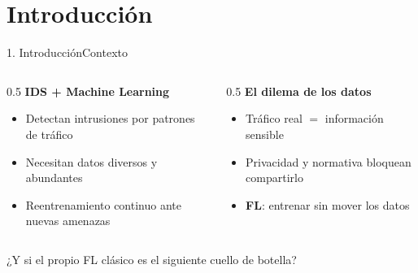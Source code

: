 \section{Introducción}
\begin{frame}{1. Introducción}{Contexto}
  \begin{columns}[T]
    \begin{column}{0.5\textwidth}
      \textbf{IDS + Machine Learning}\\[0.3em]
      \begin{itemize}
        \item Detectan intrusiones por patrones de tráfico
        \item Necesitan datos diversos y abundantes
        \item Reentrenamiento continuo ante nuevas amenazas
      \end{itemize}
    \end{column}
    \begin{column}{0.5\textwidth}
      \textbf{El dilema de los datos}\\[0.3em]
      \begin{itemize}
        \item Tráfico real $=$ información sensible
        \item Privacidad y normativa bloquean compartirlo
        \item \textcolor{UMUblue}{\textbf{FL}}: entrenar sin mover los datos
      \end{itemize}
    \end{column}
  \end{columns}
  \vfill
  \begin{block}{}
    \centering ¿Y si el propio FL clásico es el siguiente cuello de botella?
  \end{block}
\end{frame}

